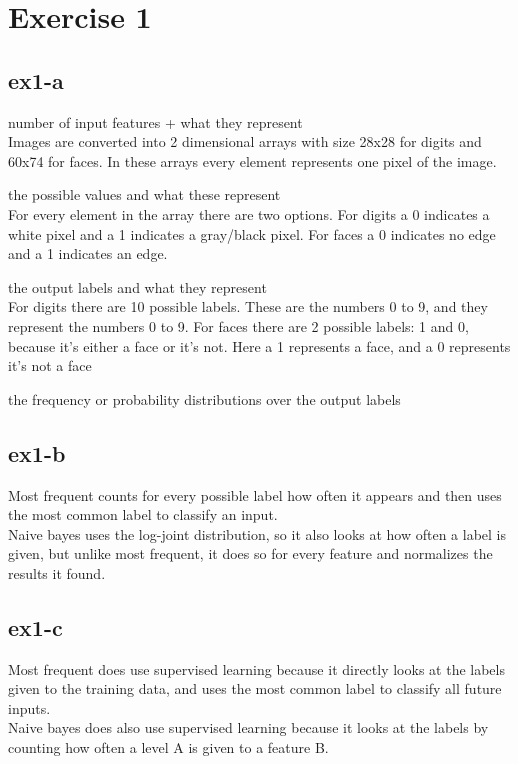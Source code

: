 \section{Exercise 1}
\label{sec:ex1}
\subsection{ex1-a}
number of input features + what they represent \\
Images are converted into 2 dimensional arrays with size 28x28 for digits and 60x74 for faces.
In these arrays every element represents one pixel of the image. 

the possible values and what these represent \\
For every element in the array there are two options. For digits a 0 indicates a white pixel
and a 1 indicates a gray/black pixel. For faces a 0 indicates no edge and a 1 indicates an edge.


the output labels and what they represent \\
For digits there are 10 possible labels. These are the numbers 0 to 9, and they represent 
the numbers 0 to 9.
For faces there are 2 possible labels: 1 and 0, because it's either a face or it's not. 
Here a 1 represents a face, and a 0 represents it's not a face

the frequency or probability distributions over the output labels \\

\subsection{ex1-b}
Most frequent counts for every possible label how often it appears and then uses the most
common label to classify an input.\\
Naive bayes uses the log-joint distribution, so it also looks at how often a label is given,
but unlike most frequent, it does so for every feature and normalizes the results it found.

\subsection{ex1-c}
Most frequent does use supervised learning because it directly looks at the labels given 
to the training data, and uses the most common label to classify all future inputs.\\
Naive bayes does also use supervised learning because it looks at the labels by counting 
how often a level A is given to a feature B.
